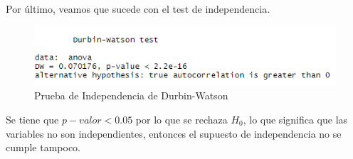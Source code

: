\documentclass[a4paper,10pt,twocolumn]{report}
\begin{document}
	Por último, veamos que sucede con el test de independencia.
	
	\begin{figure}[H]
		\centering
		\includegraphics[width=\linewidth]{img/anova/durbin}
		\caption{Prueba de Independencia de Durbin-Watson}
		\label{fig:durbin}
	\end{figure}
	
	Se tiene que $p-valor < 0.05$ por lo que se rechaza $H_0$, lo que significa que las variables no son independientes, entonces el supuesto de independencia no se cumple tampoco.
	
	
	






\newpage
\newpage




\label{end}
\end{document}
